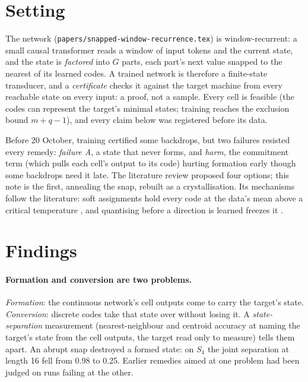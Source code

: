\documentclass[11pt]{article}
\begin{document}
\section{Setting}

The network (\texttt{papers/snapped-window-recurrence.tex}) is window-recurrent: a small causal transformer
reads a window of input tokens and the current state, and the state is \emph{factored} into $G$
parts, each part's next value snapped to the nearest of its learned codes. A trained network is
therefore a finite-state transducer, and a \emph{certificate} checks it against the target machine
from every reachable state on every input: a proof, not a sample. Every cell is feasible (the codes
can represent the target's minimal states; training reaches the exclusion bound $m + q - 1$), and
every claim below was registered before its data.

Before 20 October, training certified some backdrops, but two failures resisted every remedy:
\emph{failure A}, a state that never forms, and \emph{harm}, the commitment term (which pulls each
cell's output to its code) hurting formation early though some backdrops need it late. The literature
review proposed four options; this note is the first, annealing the snap, rebuilt as a
crystallisation. Its mechanisms follow the literature: soft assignments hold every code at the data's
mean above a critical temperature \citep{rose-1998-deterministic-annealing-clustering}, and quantising
before a direction is learned freezes it \citep{zhao-2026-continuous-first-discrete-later-vq-vae}.

\section{Findings}

\paragraph{Formation and conversion are two problems.} \emph{Formation}: the continuous network's
cell outputs come to carry the target's state. \emph{Conversion}: discrete codes take that state over
without losing it. A \emph{state-separation} measurement (nearest-neighbour and centroid accuracy at
naming the target's state from the cell outputs, the target read only to measure) tells them apart.
An abrupt snap destroyed a formed state: on $S_4$ the joint separation at length 16 fell from 0.98 to
0.25. Earlier remedies aimed at one problem had been judged on runs failing at the other.
\end{document}
